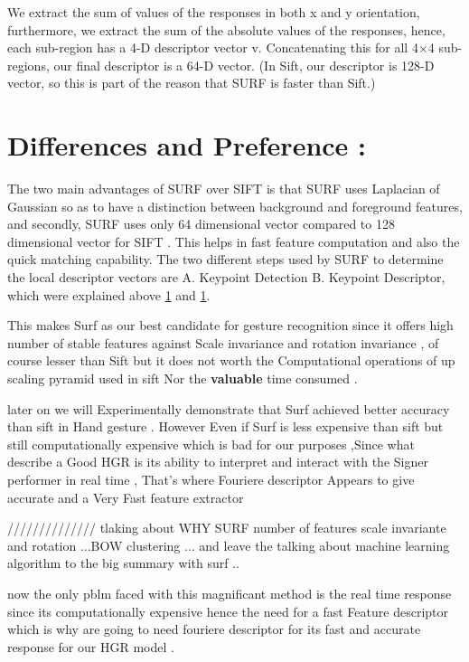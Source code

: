 We extract the sum of values of the responses in both x and y orientation, furthermore, we extract the sum of the absolute values of the responses, hence, each sub-region has a 4-D descriptor vector v. Concatenating this for all 4$\times$4 sub-regions, our final descriptor is a 64-D vector. (In Sift, our descriptor is 128-D vector, so this is part of the reason that SURF is faster than Sift.)\\


\section{Differences and Preference :}
The two main advantages of SURF over SIFT is that SURF uses Laplacian of Gaussian so as to have a distinction
between background and foreground features, and secondly, SURF uses only 64 dimensional vector compared to 128 dimensional vector for SIFT . This helps in fast feature computation and also the quick matching capability.
The two different steps used by SURF to determine the local descriptor vectors are A. Keypoint Detection B. Keypoint Descriptor, which were  explained above \ref{} and \ref{}.

This makes Surf as our best candidate for gesture recognition  since it offers high number of stable features against Scale invariance and rotation invariance , of course lesser than Sift but it does not worth the Computational operations of up scaling pyramid used in sift Nor the \textbf{valuable }time consumed .

   later on we will Experimentally demonstrate that Surf achieved  better accuracy than sift in Hand gesture . However Even if Surf is less expensive than sift but still computationally expensive which is bad for our purposes ,Since what describe a Good HGR is its ability to interpret  and interact with the Signer performer in real time , That's where Fouriere descriptor Appears to give accurate and a Very Fast feature extractor   

////////////// tlaking about WHY SURF number of features scale invariante and rotation ...BOW  clustering ... 
and leave the talking about machine learning algorithm to the big summary with surf ..

now the only pblm faced with this magnificant method is the real time response since its computationally expensive  hence the need for a fast Feature descriptor which is why are going to need  fouriere descriptor for its fast and accurate response for our HGR model .


